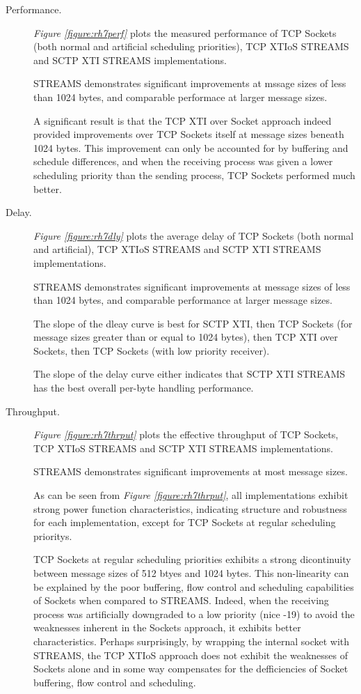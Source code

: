 \documentclass[letterpaper,final,notitlepage,twocolumn,10pt,twoside]{article}
\begin{document}
\begin{description}

\item[Performance.]

\textit{Figure \ref{figure:rh7perf}}
plots the measured performance of TCP Sockets (both normal and artificial scheduling priorities),
TCP XTIoS STREAMS and SCTP XTI STREAMS implementations.

STREAMS demonstrates significant improvements at mssage sizes of less than 1024 bytes, and
comparable performace at larger message sizes.

A significant result is that the TCP XTI over Socket approach indeed provided improvements over TCP
Sockets itself at message sizes beneath 1024 bytes.  This improvement can only be accounted for by
buffering and schedule differences, and when the receiving process was given a lower scheduling
priority than the sending process, TCP Sockets performed much better.

\item[Delay.]

\textit{Figure \ref{figure:rh7dly}}
plots the average delay of TCP Sockets (both normal and artificial), TCP XTIoS STREAMS and SCTP XTI
STREAMS implementations.

STREAMS demonstrates significant improvements at message sizes of less than 1024 bytes, and
comparable performance at larger message sizes.

The slope of the dleay curve is best for SCTP XTI, then TCP Sockets (for message sizes greater than
or equal to 1024 bytes), then TCP XTI over Sockets, then TCP Sockets (with low priority receiver).

The slope of the delay curve either indicates that SCTP XTI STREAMS has the best overall per-byte
handling performance.

\item[Throughput.]

\textit{Figure \ref{figure:rh7thrput}}
plots the effective throughput of TCP Sockets, TCP XTIoS STREAMS and SCTP XTI STREAMS
implementations.

STREAMS demonstrates significant improvements at most message sizes.

As can be seen from \textit{Figure \ref{figure:rh7thrput}}, all implementations exhibit strong power
function characteristics, indicating structure and robustness for each implementation, except for
TCP Sockets at regular scheduling prioritys.

TCP Sockets at regular scheduling priorities exhibits a strong dicontinuity between message sizes of
512 btyes and 1024 bytes.  This non-linearity can be explained by the poor buffering, flow control
and scheduling capabilities of Sockets when compared to STREAMS.  Indeed, when the receiving process
was artificially downgraded to a low priority (nice -19) to avoid the weaknesses inherent in the
Sockets approach, it exhibits better characteristics.  Perhaps surprisingly, by wrapping the
internal socket with STREAMS, the TCP XTIoS approach does not exhibit the weaknesses of Sockets
alone and in some way compensates for the defficiencies of Socket buffering, flow control and
scheduling.


\end{description}
\end{document}
